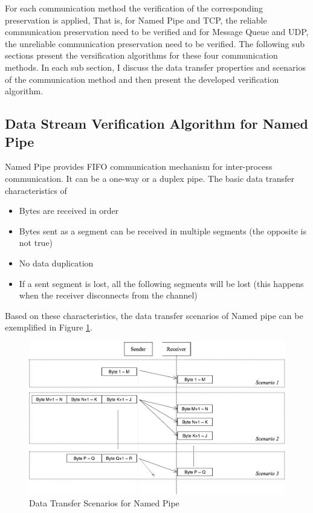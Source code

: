 For each communication method the verification of the corresponding preservation is applied, That is, for Named Pipe and TCP, the reliable communication preservation need to be verified and for Message Queue and UDP, the unreliable communication preservation need to be verified. The following sub sections present the versification  algorithms for these four communication methods. In each sub section, I discuss the data transfer properties and scenarios of the communication method and then present the developed verification algorithm.

\subsection{Data Stream Verification Algorithm for Named Pipe}
Named Pipe provides FIFO communication mechanism for inter-process communication. It can be a one-way or a duplex pipe. \cite{khambattinamed} The basic data transfer characteristics of 
\begin{itemize}
  \item Bytes are received in order
  \item Bytes sent as a segment can be received in multiple segments (the opposite is not true)
  \item No data duplication
  \item If a sent segment is lost, all the following segments will be lost (this happens when the receiver disconnects from the channel) 
  
\end{itemize}

Based on these characteristics, the data transfer scenarios of Named pipe can be exemplified in Figure \ref{namedpipe}. 
\begin{figure}[H]
\centerline{\includegraphics[scale=0.4]{Figures/namedpipe}}
\caption{Data Transfer Scenarios for Named Pipe}
\label{namedpipe}
\end{figure}

